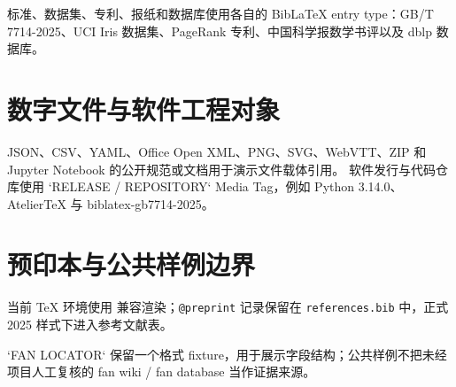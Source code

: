 \documentclass[profile=editorial]{atelier}
\begin{document}
标准、数据集、专利、报纸和数据库使用各自的 BibLaTeX entry type：GB/T 7714-2025\cite{gbt7714_2025}、UCI Iris 数据集\cite{uci_iris}、PageRank 专利\cite{page2001pagerank}、中国科学报数学书评\cite{qiyun2024math}以及 dblp 数据库\cite{dblp_database}。

\section{数字文件与软件工程对象}

JSON、CSV、YAML、Office Open XML、PNG、SVG、WebVTT、ZIP 和 Jupyter Notebook 的公开规范或文档用于演示文件载体引用\cite{rfc8259_json,rfc4180_csv,yaml_122,ecma376_ooxml,w3c_png3,w3c_svg2,w3c_webvtt,pkware_zip_appnote,jupyter_nbformat}。
软件发行与代码仓库使用 `RELEASE / REPOSITORY` Media Tag，例如 Python 3.14.0\cite{python_3140}、AtelierTeX\cite{ateliertex_repo} 与 biblatex-gb7714-2025\cite{biblatex_gb7714_repo}。

\section{预印本与公共样例边界}

\ifstrequal{\AtelierActualGBStyle}{gb7714-2025}{%
GB/T 7714-2025 环境原生演示 \verb|@preprint|：Attention Is All You Need 的 arXiv 版本\cite{vaswani2017attention_preprint}。%
}{%
当前 TeX 环境使用 \texttt{\AtelierActualGBStyle} 兼容渲染；\texttt{@preprint} 记录保留在 \texttt{references.bib} 中，正式 2025 样式下进入参考文献表。%
}

`FAN LOCATOR` 保留一个格式 fixture，用于展示字段结构；公共样例不把未经项目人工复核的 fan wiki / fan database 当作证据来源。

\nocite{fan_locator_fixture}
\printbibliography
\end{document}
